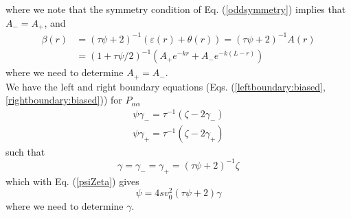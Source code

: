 \documentclass[pre,aps,superscriptaddress,nofootinbib]{revtex4}
\begin{document}
where we note that the symmetry condition of Eq. (\ref{oddsymmetry}) implies that $A_- = A_+$, and
\begin{equation}
\begin{aligned}
\beta(r) &= (\tau\psi + 2)^{-1}(\varepsilon(r) + \theta(r)) = (\tau \psi + 2)^{-1} A(r)\\
&= (1 + \tau\psi/2)^{-1}(A_+ e^{-k r} + A_- e^{-k (L - r)})
\end{aligned}
\label{beta}
\end{equation}
where we need to determine $A_+ = A_-$.\\

We have the left and right boundary equations (Eqs. (\ref{leftboundary:biased}, \ref{rightboundary:biased})) for $P_{\alpha\alpha}$
\begin{eqnarray}
\psi \gamma_- = \tau^{-1} (\zeta - 2 \gamma_-)\\
\psi \gamma_+ = \tau^{-1} (\zeta - 2 \gamma_+)
\end{eqnarray}
such that
\begin{equation}
\gamma = \gamma_- = \gamma_+ = (\tau \psi + 2)^{-1} \zeta
\label{ratio_gamma}
\end{equation}
which with Eq. (\ref{psiZeta}) gives
\begin{equation}
\psi = 4 s v_0^2 (\tau \psi + 2) \gamma
\label{gammaPsi}
\end{equation}
where we need to determine $\gamma$.\\
\end{document}
